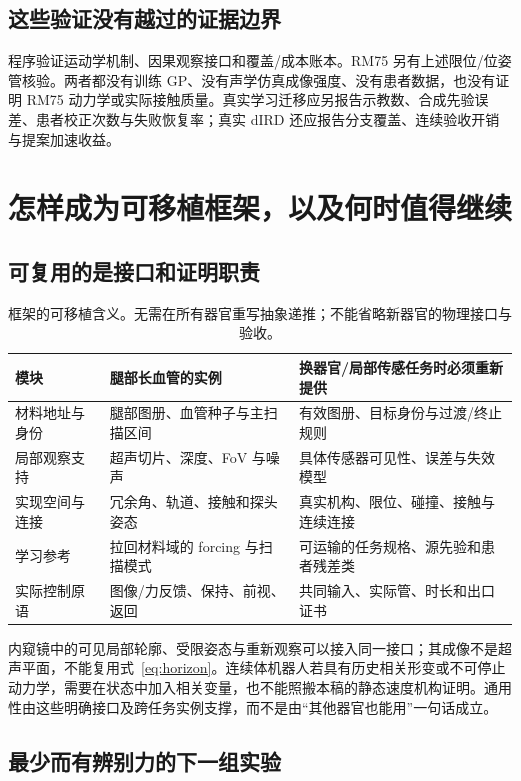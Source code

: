 \documentclass[11pt,a4paper]{article}
\theoremstyle{cn}
\begin{document}
\subsection{这些验证没有越过的证据边界}

程序验证运动学机制、因果观察接口和覆盖/成本账本。RM75 另有上述限位/位姿管核验。两者都没有训练 GP、没有声学仿真成像强度、没有患者数据，也没有证明 RM75 动力学或实际接触质量。真实学习迁移应另报告示教数、合成先验误差、患者校正次数与失败恢复率；真实 dIRD 还应报告分支覆盖、连续验收开销与提案加速收益。

\section{怎样成为可移植框架，以及何时值得继续}
\label{sec:scope}

\subsection{可复用的是接口和证明职责}

\begin{table}[htbp]
\centering\small
\begin{tabularx}{\linewidth}{@{}p{.20\linewidth}XX@{}}
\toprule
模块 & 腿部长血管的实例 & 换器官/局部传感任务时必须重新提供\\
\midrule
材料地址与身份 & 腿部图册、血管种子与主扫描区间 & 有效图册、目标身份与过渡/终止规则\\
局部观察支持 & 超声切片、深度、FoV 与噪声 & 具体传感器可见性、误差与失效模型\\
实现空间与连接 & 冗余角、轨道、接触和探头姿态 & 真实机构、限位、碰撞、接触与连续连接\\
学习参考 & 拉回材料域的 forcing 与扫描模式 & 可运输的任务规格、源先验和患者残差类\\
实际控制原语 & 图像/力反馈、保持、前视、返回 & 共同输入、实际管、时长和出口证书\\
\bottomrule
\end{tabularx}
\caption{框架的可移植含义。无需在所有器官重写抽象递推；不能省略新器官的物理接口与验收。}
\end{table}

内窥镜中的可见局部轮廓、受限姿态与重新观察可以接入同一接口；其成像不是超声平面，不能复用式~\eqref{eq:horizon}。连续体机器人若具有历史相关形变或不可停止动力学，需要在状态中加入相关变量，也不能照搬本稿的静态速度机构证明。通用性由这些明确接口及跨任务实例支撑，而不是由“其他器官也能用”一句话成立。

\subsection{最少而有辨别力的下一组实验}
\end{document}
